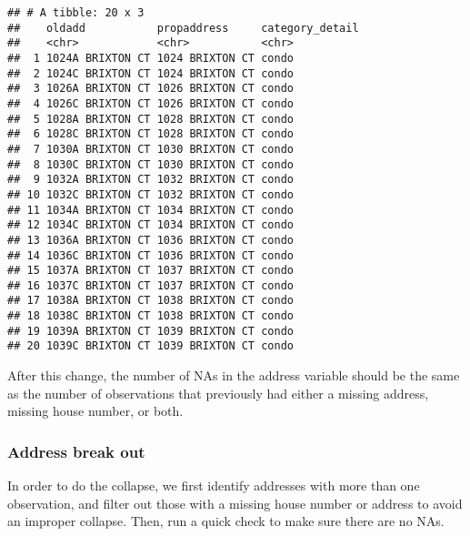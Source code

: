 \documentclass[]{article}
\newenvironment{Shaded}{\begin{snugshade}}{\end{snugshade}}
\newcommand{\KeywordTok}[1]{\textcolor[rgb]{0.13,0.29,0.53}{\textbf{#1}}}
\newcommand{\StringTok}[1]{\textcolor[rgb]{0.31,0.60,0.02}{#1}}
\newcommand{\OperatorTok}[1]{\textcolor[rgb]{0.81,0.36,0.00}{\textbf{#1}}}
\newcommand{\NormalTok}[1]{#1}
\begin{document}
\begin{verbatim}
## # A tibble: 20 x 3
##    oldadd           propaddress     category_detail
##    <chr>            <chr>           <chr>          
##  1 1024A BRIXTON CT 1024 BRIXTON CT condo          
##  2 1024C BRIXTON CT 1024 BRIXTON CT condo          
##  3 1026A BRIXTON CT 1026 BRIXTON CT condo          
##  4 1026C BRIXTON CT 1026 BRIXTON CT condo          
##  5 1028A BRIXTON CT 1028 BRIXTON CT condo          
##  6 1028C BRIXTON CT 1028 BRIXTON CT condo          
##  7 1030A BRIXTON CT 1030 BRIXTON CT condo          
##  8 1030C BRIXTON CT 1030 BRIXTON CT condo          
##  9 1032A BRIXTON CT 1032 BRIXTON CT condo          
## 10 1032C BRIXTON CT 1032 BRIXTON CT condo          
## 11 1034A BRIXTON CT 1034 BRIXTON CT condo          
## 12 1034C BRIXTON CT 1034 BRIXTON CT condo          
## 13 1036A BRIXTON CT 1036 BRIXTON CT condo          
## 14 1036C BRIXTON CT 1036 BRIXTON CT condo          
## 15 1037A BRIXTON CT 1037 BRIXTON CT condo          
## 16 1037C BRIXTON CT 1037 BRIXTON CT condo          
## 17 1038A BRIXTON CT 1038 BRIXTON CT condo          
## 18 1038C BRIXTON CT 1038 BRIXTON CT condo          
## 19 1039A BRIXTON CT 1039 BRIXTON CT condo          
## 20 1039C BRIXTON CT 1039 BRIXTON CT condo
\end{verbatim}

After this change, the number of NAs in the address variable should be
the same as the number of observations that previously had either a
missing address, missing house number, or both.

\begin{Shaded}
\end{Shaded}

\subsubsection{Address break out}\label{address-break-out}

In order to do the collapse, we first identify addresses with more than
one observation, and filter out those with a missing house number or
address to avoid an improper collapse. Then, run a quick check to make
sure there are no NAs.
\end{document}
